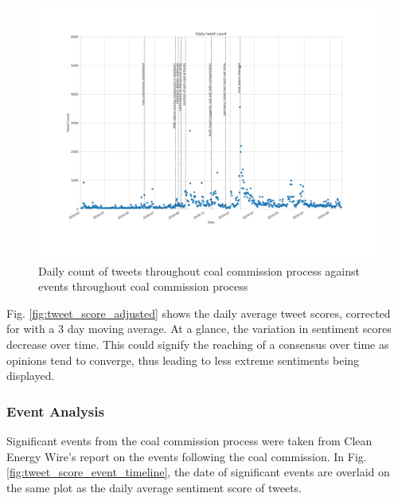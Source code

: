 \documentclass[10pt,twocolumn,twoside,lineno]{pnas-new}
\begin{document}
\begin{figure}
	\begin{center}
		\includegraphics[width=\linewidth]{figures/tweet_count_event_timeline}
	\end{center}
	\caption{Daily count of tweets throughout coal commission process against events throughout coal commission process}
	\label{fig:tweet_count_event_timeline}
\end{figure}

Fig. \ref{fig:tweet_score_adjusted} shows the daily average tweet scores, corrected for with a 3 day moving average. At a glance, the variation in sentiment scores decrease over time. This could signify the reaching of a consensus over time as opinions tend to converge, thus leading to less extreme sentiments being displayed. 

\subsubsection*{Event Analysis} 
Significant events from the coal commission process were taken from Clean Energy Wire's report on the events following the coal commission. \cite{Amelang2019} In Fig. \ref{fig:tweet_score_event_timeline}, the date of significant events are overlaid on the same plot as the daily average sentiment score of tweets. 
 
\end{document}
